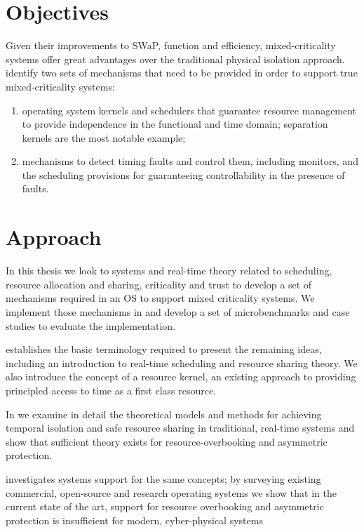 \section{Objectives}

Given their improvements to \gls{SWaP}, function and efficiency, mixed-criticality systems offer
great advantages over the traditional physical isolation approach. 
\citet{Ernst_DiNatale_16} identify two sets of mechanisms that need to be provided in order to
support true mixed-criticality systems:

\begin{enumerate}
    \item operating system kernels and schedulers that guarantee resource
        management to provide independence in the
        functional and time domain; separation kernels
        are the most notable example;
    \item mechanisms to detect timing faults and control
        them, including monitors, and the scheduling
        provisions for guaranteeing controllability in the
        presence of faults.
\end{enumerate}


\section{Approach}

In this thesis we look to systems and real-time theory related to scheduling, resource allocation
and sharing, criticality and trust to develop a set of mechanisms required in an \gls{OS} to 
support mixed criticality systems. We implement those mechanisms in \selfour and develop a set of
microbenchmarks and case studies to evaluate the implementation. 

 establishes the basic terminology required to present
the remaining ideas, including an introduction to real-time scheduling and resource sharing theory.
We also introduce the concept of a resource kernel, an existing approach to providing principled
access to time as a first class resource.

In  we examine in detail the theoretical models and methods for achieving temporal
isolation and safe resource sharing in traditional, real-time systems and show that sufficient
theory exists for resource-overbooking and asymmetric protection.

investigates systems support for the same concepts; by surveying existing commercial, open-source
and research operating systems we show that in the current state of the art, support for resource
overbooking and asymmetric protection is insufficient for modern, cyber-physical systems


